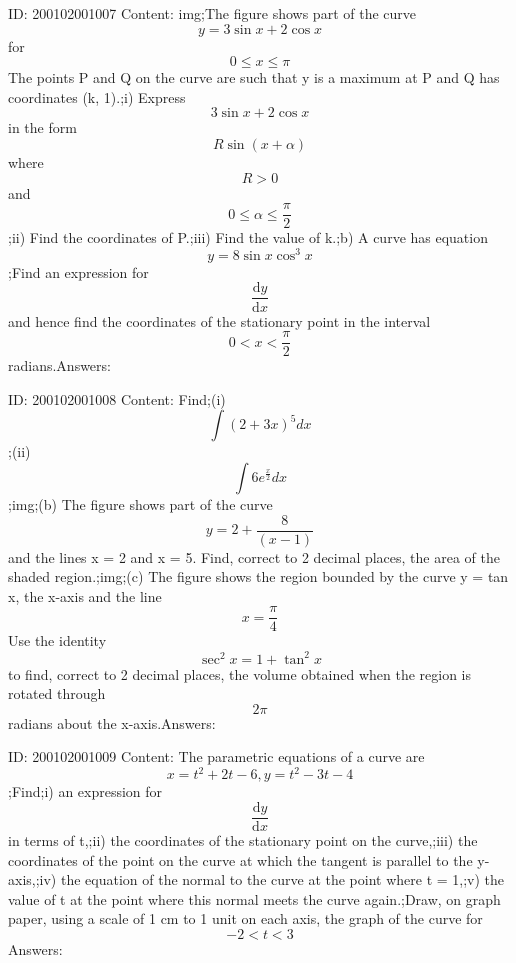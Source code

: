 \documentclass{article}
\begin{document}
ID: 200102001007
Content:
img;The figure shows part of the curve \[y = 3 \sin x + 2 \cos x \] for \[0\leq x\leq \pi\] The points P and Q on the curve are such that y is a maximum at P and Q has coordinates (k, 1).;i) Express \[3 \sin x + 2 \cos x  \] in the form \[R\sin(x + \alpha)\]where \[R > 0 \]and \[0\leq \alpha\leq \frac{\pi }{2}\];ii) Find the coordinates of P.;iii) Find the value of k.;b) A curve has equation \[y=8\sin x\cos^3x\];Find an expression for \[\frac{\mathrm{d} y}{\mathrm{d} x}\] and hence find the coordinates of the stationary point in the interval \[0< x<\frac{\pi }{2}\] radians.Answers:

ID: 200102001008
Content:
Find;(i) \[\int(2+3x)^5dx\] ;(ii) \[\int 6e^{\frac{x}{2}}dx\];img;(b) The figure shows part of the curve \[y=2+\frac{8}{(x-1)}\] and the lines x = 2 and x = 5. Find, correct to 2 decimal places, the area of the shaded region.;img;(c) The figure shows the region bounded by the curve y = tan x, the x-axis and the line \[x=\frac{\pi }{4}\] Use the identity \[\sec^2x=1+\tan^2x\] to find, correct to 2 decimal places, the volume obtained when the region is rotated through \[2\pi \] radians about the x-axis.Answers:

ID: 200102001009
Content:
The parametric equations of a curve are \[x=t^2+2t-6, y=t^2-3t-4\];Find;i) an expression for \[\frac{\mathrm{d} y}{\mathrm{d} x}\]in terms of t,;ii) the coordinates of the stationary point on the curve,;iii) the coordinates of the point on the curve at which the tangent is parallel to the y-axis,;iv) the equation of the normal to the curve at the point where t = 1,;v) the value of t at the point where this normal meets the curve again.;Draw, on graph paper, using a scale of 1 cm to 1 unit on each axis, the graph of the curve for \[- 2<  t< 3\]Answers:
\end{document}
